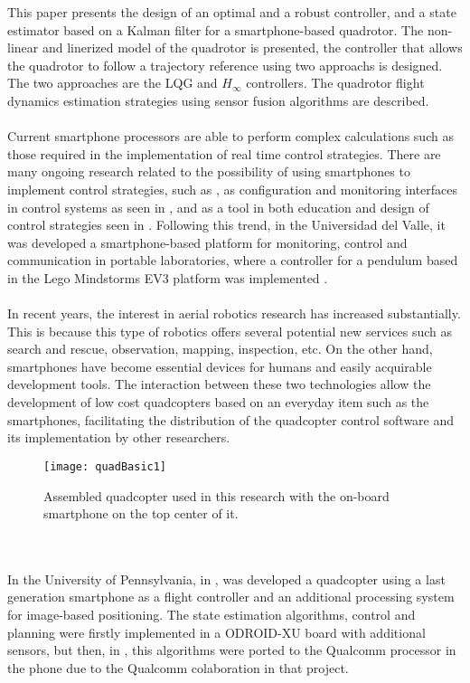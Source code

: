 This paper presents the design of an optimal and a robust controller, and a state estimator based on a Kalman filter for a smartphone-based quadrotor. The non-linear and linerized model of the quadrotor is presented, the controller that allows the quadrotor to follow a trajectory reference using two approachs is designed. The two approaches are the LQG and $H_\infty$ controllers. The quadrotor flight dynamics estimation strategies using sensor fusion algorithms are described. 
\\\\
Current smartphone processors are able to perform complex calculations such as those required in the implementation of real time control strategies. There are many ongoing research related to the possibility of using smartphones to implement control strategies, such as \cite{Drumea2013a}, as configuration and monitoring interfaces in control systems as seen in \cite{Lin2014a,Truong2012a}, and as a tool in both education and design of control strategies seen in \cite{Aristizabal2014a,WuWu2013a}. Following this trend, in the Universidad del Valle, it was developed a smartphone-based platform for monitoring, control and communication in portable laboratories, where a controller for a pendulum based in the Lego Mindstorms EV3 platform was implemented \cite {GarciaTellez2015}.
\\\\
In recent years, the interest in aerial robotics research has increased substantially. This is because this type of robotics offers several potential new services such as search and rescue, observation, mapping, inspection, etc. On the other hand, smartphones have become essential devices for humans and easily acquirable development tools. The interaction between these two technologies allow the development of low cost quadcopters based on an everyday item such as the smartphones, facilitating the distribution of the quadcopter control software and its implementation by other researchers.
\begin{figure}[h]
\begin{center}
\texttt{[image: quadBasic1]}    
\caption{Assembled quadcopter used in this research with the on-board smartphone on the top center of it.} 
\label{fig:quads500}
\end{center}
\end{figure}
\\\\
In the University of Pennsylvania, in \cite{Loianno2015}, was developed a quadcopter using a last generation smartphone as a flight controller and an additional processing system for image-based positioning. The state estimation algorithms, control and planning were firstly implemented in a ODROID-XU board with additional sensors, but then, in \cite{Loianno2015a}, this algorithms were ported to the Qualcomm processor in the phone due to the Qualcomm colaboration in that project.
